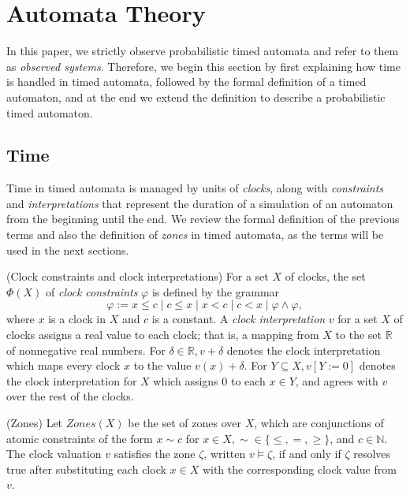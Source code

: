 \section{Automata Theory}
In this paper, we strictly observe probabilistic timed automata and refer to them as \textit{observed systems}.
%
Therefore, we begin this section by first explaining how time is handled in timed automata, followed by the formal definition of a timed automaton, and at the end we extend the definition to describe a probabilistic timed automaton.

\subsection{Time}
Time in timed automata is managed by units of \textit{clocks}, along with \textit{constraints} and \textit{interpretations} that represent the duration of a simulation of an automaton from the beginning until the end. We review the formal definition of the previous terms and also the definition of \textit{zones} in timed automata, as the terms will be used in the next sections. 
%
\theoremstyle{definition}
\begin{definition}{(Clock constraints and clock interpretations)} \cite{timedAutomata}
	For a set $X$ of clocks, the set $\Phi (X)$ of \textit{clock constraints} $\varphi$ is defined by the grammar 
	\begin{equation}
		\varphi := x \leq c \mid c\leq x \mid x<c \mid c<x \mid \varphi \land \varphi,
	\end{equation}
	where $x$ is a clock in $X$ and $c$ is a constant. A \textit{clock interpretation} $v$ for a set $X$ of clocks assigns a real value to each clock; that is, a mapping from $X$ to the set $\mathbb{R}$ of nonnegative real numbers. For $\delta \in \mathbb{R}, v + \delta$ denotes the clock interpretation which maps every clock $x$ to the value $v(x) + \delta$. For $Y \subseteq X, v[Y:=0]$ denotes the clock interpretation for $X$ which assigns 0 to each $x \in Y$, and agrees with $v$ over the rest of the clocks. 
\end{definition}
%
\theoremstyle{definition}
\begin{definition}{(Zones)} \cite{probabilisticTimedAutomata} 
	Let $Zones(X)$ be the set of zones over $X$, which are conjunctions of atomic constraints of the form $x \sim c$ for $x \in X, \sim \in \{\leq, = , \geq \}$, and $c \in \mathbb{N}$. The clock valuation $v$ satisfies the zone $\zeta$, written $v \models \zeta$, if and only if $\zeta$ resolves true after substituting each clock $x \in X$ with the corresponding clock value from $v$. 
\end{definition}
%
